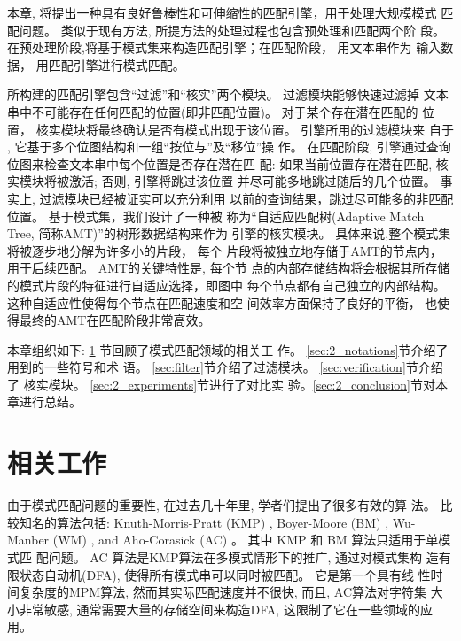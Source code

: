 本章, 将提出一种具有良好鲁棒性和可伸缩性的匹配引擎，用于处理大规模模式
匹配问题。 类似于现有方法, 所提方法的处理过程也包含预处理和匹配两个阶
段。 在预处理阶段,将基于模式集来构造匹配引擎；在匹配阶段， 用文本串作为
输入数据， 用匹配引擎进行模式匹配。

所构建的匹配引擎包含“过滤”和“核实”两个模块。 过滤模块能够快速过滤掉
文本串中不可能存在任何匹配的位置(即非匹配位置)。 对于某个存在潜在匹配的
位置， 核实模块将最终确认是否有模式出现于该位置。 引擎所用的过滤模块来
自于 \cite{Lee2013}, 它基于多个位图结构和一组“按位与”及“移位”操
作。 在匹配阶段, 引擎通过查询位图来检查文本串中每个位置是否存在潜在匹
配: 如果当前位置存在潜在匹配, 核实模块将被激活; 否则, 引擎将跳过该位置
并尽可能多地跳过随后的几个位置。 事实上, 过滤模块已经被证实可以充分利用
以前的查询结果，跳过尽可能多的非匹配位置。 基于模式集，我们设计了一种被
称为“自适应匹配树(Adaptive Match Tree, 简称AMT)”的树形数据结构来作为
引擎的核实模块。 具体来说,整个模式集将被逐步地分解为许多小的片段， 每个
片段将被独立地存储于AMT的节点内，用于后续匹配。 AMT的关键特性是, 每个节
点的内部存储结构将会根据其所存储的模式片段的特征进行自适应选择，即图中
每个节点都有自己独立的内部结构。 这种自适应性使得每个节点在匹配速度和空
间效率方面保持了良好的平衡， 也使得最终的AMT在匹配阶段非常高效。

本章组织如下: \ref{sec:2_RW} 节回顾了模式匹配领域的相关工
作。  \ref{sec:2_notations}节介绍了用到的一些符号和术
语。 \ref{sec:filter}节介绍了过滤模块。 \ref{sec:verification}节介绍了
核实模块。 \ref{sec:2_experiments}节进行了对比实
验。\ref{sec:2_conclusion}节对本章进行总结。

\section{相关工作}
\label{sec:2_RW}

由于模式匹配问题的重要性, 在过去几十年里, 学者们提出了很多有效的算
法。 比较知名的算法包括: Knuth-Morris-Pratt (\textsf{KMP})
\cite{Knuth1977}, Boyer-Moore (\textsf{BM}) \cite{Boyer1977},
Wu-Manber (\textsf{WM}) \cite{Wu1994}, and Aho-Corasick (\textsf{AC})
\cite{Aho1975}。 其中 \textsf{KMP} 和 \textsf{BM} 算法只适用于单模式匹
配问题。  \textsf{AC} 算法是KMP算法在多模式情形下的推广, 通过对模式集构
造有限状态自动机(DFA), 使得所有模式串可以同时被匹配。 它是第一个具有线
性时间复杂度的MPM算法, 然而其实际匹配速度并不很快, 而且, AC算法对字符集
大小非常敏感, 通常需要大量的存储空间来构造DFA, 这限制了它在一些领域的应
用。


